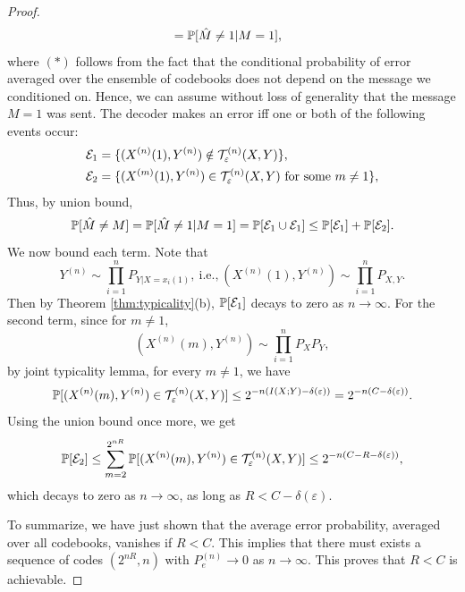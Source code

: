 \documentclass[11pt,a4paper]{article}
\begin{document}
\begin{proof}
\begin{align*}
        &= \mathbb{P}[\hat{M}\neq 1| M = 1],
    \end{align*}
    where $(*)$ follows from the fact that the conditional probability of error averaged over the ensemble of codebooks does not depend on the message we conditioned on. Hence, we can assume without loss of generality that the message $M = 1$ was sent. The decoder makes an error iff one or both of the following events occur:
    \begin{align*}
        \mathcal{E}_1 &= \{(X^{(n)}(1),Y^{(n)})\notin \mathcal{T}^{(n)}_\varepsilon(X,Y)\}, \\
        \mathcal{E}_2 &= \{(X^{(m)}(1),Y^{(n)})\in \mathcal{T}^{(n)}_\varepsilon(X,Y)\ \text{for some}\ m\neq 1\},
    \end{align*}
    Thus, by union bound,
    \begin{equation*}
        \mathbb{P}[\hat{M}\neq M] = \mathbb{P}[\hat{M}\neq 1 | M = 1] = \mathbb{P}[\mathcal{E}_1\cup \mathcal{E}_1] \le \mathbb{P}[\mathcal{E}_1] + \mathbb{P}[\mathcal{E}_2].
    \end{equation*}
    We now bound each term. Note that 
    \begin{equation*}
        Y^{(n)}\sim \prod_{i=1}^{n} P_{Y|X = x_i(1)},\ \text{i.e.,}\ (X^{(n)}(1), Y^{(n)}) \sim \prod_{i=1}^{n} P_{X,Y}.
    \end{equation*}
    Then by Theorem \ref{thm:typicality}(b), $\mathbb{P}[\mathcal{E}_1]$ decays to zero as $n\rightarrow \infty$. For the second term, since for $m\neq 1$,
    \begin{equation*}
        (X^{(n)}(m),Y^{(n)})\sim \prod_{i=1}^{n} P_{X}P_Y,
    \end{equation*}
    by joint typicality lemma, for every $m\neq 1$, we have
    \begin{equation*}
        \mathbb{P}[(X^{(n)}(m),Y^{(n)})\in \mathcal{T}^{(n)}_\varepsilon(X,Y)] \le 2^{-n(I(X;Y)-\delta(\varepsilon))} = 2^{-n(C-\delta(\varepsilon))}.
    \end{equation*}
    Using the union bound once more, we get 
    \begin{equation*}
        \mathbb{P}[\mathcal{E}_2] \le \sum_{m=2}^{2^{nR}} \mathbb{P}[(X^{(n)}(m),Y^{(n)})\in \mathcal{T}^{(n)}_\varepsilon(X,Y)] \le 2^{-n(C-R-\delta(\varepsilon))},
    \end{equation*}
    which decays to zero as $n\rightarrow \infty$, as long as $R<C-\delta(\varepsilon)$.

    To summarize, we have just shown that the average error probability, averaged over all codebooks, vanishes if $R < C$. This implies that there must exists a sequence of codes $(2^{nR}, n)$ with $P^{(n)}_e \rightarrow 0$ as $n \rightarrow \infty$. This proves that $R < C$ is achievable.


\end{proof}
\end{document}
